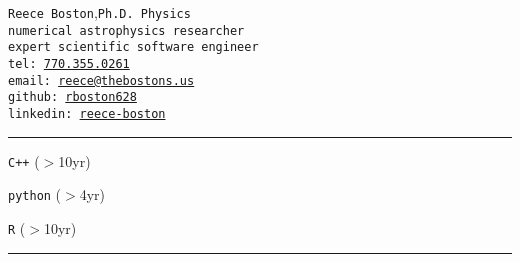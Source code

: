 \documentclass[11pt, letter]{article}
\begin{document}
\begin{multicols}{2}
 \noindent %
 {\tt \huge  Reece Boston},\hfill{\tt \large Ph.D.~Physics}\\
	{\tt\small numerical astrophysics researcher\hfill\drawplanet}\\
	{\tt\small expert scientific software engineer\hfill\drawcalculator\hspace{1pt}\mbox{}}
%
 \columnbreak\\
 \mbox{}\hfill{\tt \small tel: \href{tel:770-355-0261}{770.355.0261}\hphantom{aaaaaaa}}\\  %
 \mbox{}\hfill{\tt \small email: \href{mailto:Reece@thebostons.us}{reece@thebostons.us}}\\ %
 \mbox{}\hfill{\tt \small github: \href{https://github.com/rboston628}{rboston628}\hphantom{aaaaaaaaa}}\\%
 \mbox{}\hfill{\tt \small linkedin: \href{https://www.linkedin.com/in/reece-boston-752046117/}{reece-boston}\hphantom{aaaaaaa}}%
\end{multicols}

\hrule
\begin{itemize}
\begin{multicols}{3}	
	\item {\tt C++} ($>$10yr)\\
		\mygauss{0.8}
	\item {\tt python} ($>$4yr)\\
		\mygauss{0.8}
	\item {\tt R} ($>$10yr)\\
		\mygauss{0.6}
\end{multicols}
\end{itemize}
\hrule
\vspace{-0.5\baselineskip}

\end{document}
